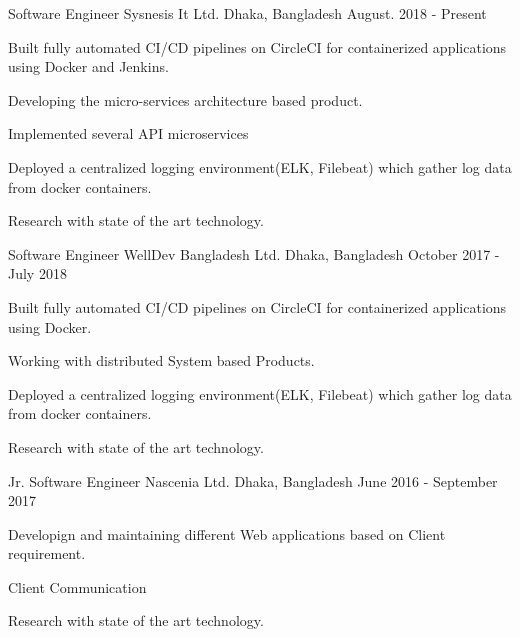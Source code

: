 

\begin{cventries}

  \cventry
    {Software Engineer} %
    {Sysnesis It Ltd.} %
    {Dhaka, Bangladesh} %
    {August. 2018 - Present} %
    {
      \begin{cvitems} %
        \item {Built fully automated CI/CD pipelines on CircleCI for containerized applications using Docker and Jenkins.}
        \item {Developing the micro-services architecture based product.}
        \item {Implemented several API microservices}
        \item {Deployed a centralized logging environment(ELK, Filebeat) which gather log data from docker containers.}
        \item {Research with state of the art technology.}
      \end{cvitems}
    }

\cventry
{Software Engineer} %
{WellDev Bangladesh Ltd.} %
{Dhaka, Bangladesh} %
{October 2017 - July 2018} %
{
	\begin{cvitems} %
		\item {Built fully automated CI/CD pipelines on CircleCI for containerized applications using Docker.}
		\item {Working with distributed System based Products.}
		\item {Deployed a centralized logging environment(ELK, Filebeat) which gather log data from docker containers.}
		\item {Research with state of the art technology.}
	\end{cvitems}
}
\cventry
{Jr. Software Engineer} %
{Nascenia Ltd.} %
{Dhaka, Bangladesh} %
{June 2016 - September 2017} %
{
	\begin{cvitems} %
		\item {Developign and maintaining different Web applications based on Client requirement.}
		\item {Client Communication}
		\item {Research with state of the art technology.}
	\end{cvitems}
}


\end{cventries}
